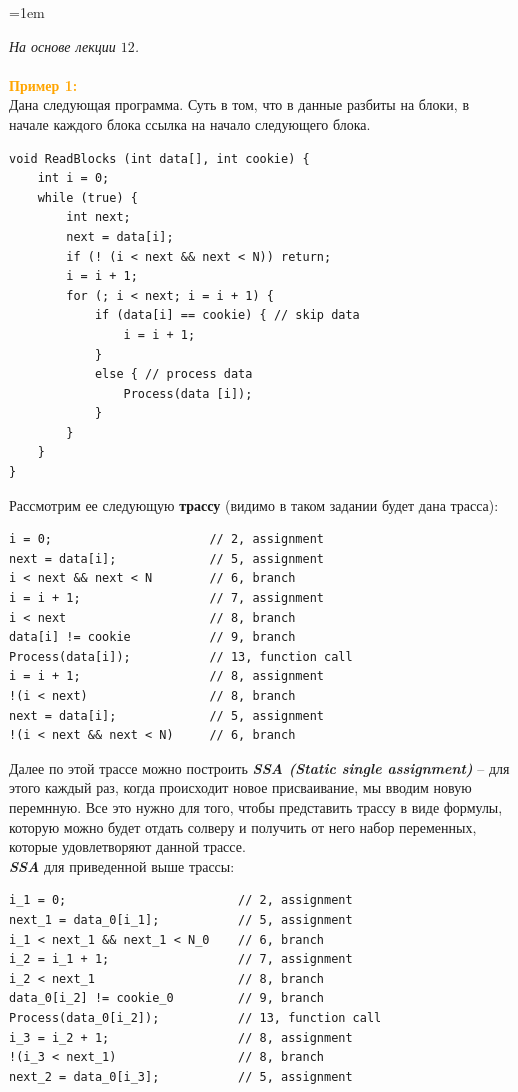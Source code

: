 \documentclass[12pt]{extreport}
\theoremstyle{definiton}
\theoremstyle{definition}
\theoremstyle{definition}
\newcommand{\solution}[2][\color{myblue}Ответ]{
\medskip
	\noindent{\bfseries #1 }{{\color{myblue}\bfseries #2:}}
}
\newenvironment{blockquote}{%
  \par%
  \medskip
  \leftskip=1em%
  \noindent}{%
  \par\medskip}
\begin{document}
\solution{23}
\begin{blockquote}
{\color{myblue}
\textcolor{mypurpur}{\textit{На основе лекции $12$.}}\\
\\
\noindent \textbf{\textcolor{orange}{Пример 1:}}\\
\noindent Дана следующая программа. Суть в том, что в данные разбиты на блоки, в начале каждого блока ссылка на начало следующего блока.
\begin{lstlisting}
void ReadBlocks (int data[], int cookie) {
    int i = 0;
    while (true) {
        int next;
        next = data[i];
        if (! (i < next && next < N)) return;
        i = i + 1;
        for (; i < next; i = i + 1) {
            if (data[i] == cookie) { // skip data
                i = i + 1;
            }
            else { // process data
                Process(data [i]);
            }
        }
    }
}
\end{lstlisting}
Рассмотрим ее следующую \textbf{трассу} (видимо в таком задании будет дана трасса):
\begin{lstlisting}
i = 0;                      // 2, assignment
next = data[i];             // 5, assignment
i < next && next < N        // 6, branch
i = i + 1;                  // 7, assignment
i < next                    // 8, branch
data[i] != cookie           // 9, branch
Process(data[i]);           // 13, function call
i = i + 1;                  // 8, assignment
!(i < next)                 // 8, branch
next = data[i];             // 5, assignment
!(i < next && next < N)     // 6, branch
\end{lstlisting}
Далее по этой трассе можно построить \textbf{\textit{SSA (Static single assignment)}} -- для этого каждый раз, когда происходит новое присваивание, мы вводим новую перемнную. Все это нужно для того, чтобы представить трассу в виде формулы, которую можно будет отдать солверу и получить от него набор переменных, которые удовлетворяют данной трассе.\\
\textbf{\textit{SSA}} для приведенной выше трассы:
\begin{lstlisting}
i_1 = 0;                        // 2, assignment
next_1 = data_0[i_1];           // 5, assignment
i_1 < next_1 && next_1 < N_0    // 6, branch
i_2 = i_1 + 1;                  // 7, assignment
i_2 < next_1                    // 8, branch
data_0[i_2] != cookie_0         // 9, branch
Process(data_0[i_2]);           // 13, function call
i_3 = i_2 + 1;                  // 8, assignment
!(i_3 < next_1)                 // 8, branch
next_2 = data_0[i_3];           // 5, assignment

\end{lstlisting}}
\end{blockquote}
\end{document}
